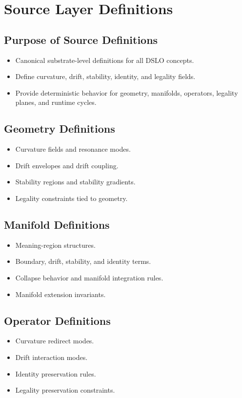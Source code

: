 \section{Source Layer Definitions}

\subsection{Purpose of Source Definitions}
\begin{itemize}
    \item Canonical substrate-level definitions for all DSLO concepts.
    \item Define curvature, drift, stability, identity, and legality fields.
    \item Provide deterministic behavior for geometry, manifolds, operators, legality planes, and runtime cycles.
\end{itemize}

\subsection{Geometry Definitions}
\begin{itemize}
    \item Curvature fields and resonance modes.
    \item Drift envelopes and drift coupling.
    \item Stability regions and stability gradients.
    \item Legality constraints tied to geometry.
\end{itemize}

\subsection{Manifold Definitions}
\begin{itemize}
    \item Meaning-region structures.
    \item Boundary, drift, stability, and identity terms.
    \item Collapse behavior and manifold integration rules.
    \item Manifold extension invariants.
\end{itemize}

\subsection{Operator Definitions}
\begin{itemize}
    \item Curvature redirect modes.
    \item Drift interaction modes.
    \item Identity preservation rules.
    \item Legality preservation constraints.
\end{itemize}

